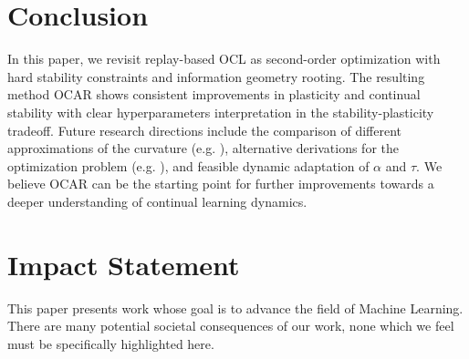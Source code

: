 
\section{Conclusion}
In this paper, we revisit replay-based OCL as second-order optimization with hard stability constraints and information geometry rooting. The resulting method OCAR shows consistent improvements in plasticity and continual stability with clear hyperparameters interpretation in the stability-plasticity tradeoff.
Future research directions include the comparison of different approximations of the curvature (e.g. \citet{george2018fast}), alternative derivations for the optimization problem (e.g. \citet{benzing2022gradient}), and feasible dynamic adaptation of $\alpha$ and $\tau$. We believe OCAR can be the starting point for further improvements towards a deeper understanding of continual learning dynamics.

\section*{Impact Statement}
This paper presents work whose goal is to advance the field of Machine Learning. There are many potential societal consequences of our work, none which we feel must be specifically highlighted here.